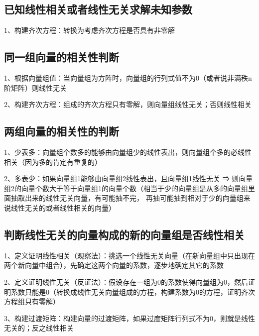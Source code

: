 \subsection{已知线性相关或者线性无关求解未知参数}

1、构建齐次方程：转换为考虑齐次方程是否具有非零解



\subsection{同一组向量的相关性判断}

1、根据向量组值：当向量组为方阵时，向量组的行列式值不为0（或者说非满秩n阶矩阵）则线性无关

2、构建齐次方程：组成的齐次方程只有零解，则向量组线性无关；否则线性相关



\subsection{两组向量的相关性的判断}

1、少表多：向量组个数多的能够由向量组少的线性表出，则向量组个多的必线性相关（因为多的肯定有重复的）

2、多表少：如果向量组1能够由向量组2线性表出，且向量组1线性无关 ⇒ 则向量组2的向量个数大于等于向量组1的向量个数（相当于少的向量组是从多的向量组里面抽取出来的线性无关向量，有可能抽不完， 再抽可能抽到相对于少的向量组来说线性无关的或者线性相关的向量）



\subsection{判断线性无关的向量构成的新的向量组是否线性相关}

1、定义证明线性相关（观察法）：挑选一个线性无关向量（在新向量组中只出现在两个新向量中组合），先确定这两个向量的系数，逐步地确定其它的系数

2、定义证明线性无关（反证法）：假设存在一组为0的系数使得向量组为0，然后证明系数只能是0（转换成线性无关向量组成的方程，构建系数为0的方程，证明齐次方程组只有零解）

3、构建过渡矩阵：构建向量的过渡矩阵，如果过度矩阵行列式不为0，则就是线性无关的；反之线性相关



